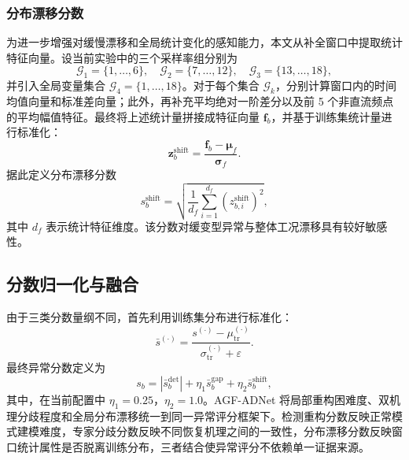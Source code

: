 \documentclass[bachelor, vlined]{DissertUESTC}
\begin{document}
    \subsubsection{分布漂移分数}

    为进一步增强对缓慢漂移和全局统计变化的感知能力，本文从补全窗口中提取统计特征向量。设当前实验中的三个采样率组分别为
    \begin{equation}
        \mathcal{G}_1=\{1,\ldots,6\},\quad
        \mathcal{G}_2=\{7,\ldots,12\},\quad
        \mathcal{G}_3=\{13,\ldots,18\},
    \end{equation}
    并引入全局变量集合 $\mathcal{G}_4=\{1,\ldots,18\}$。对于每个集合 $\mathcal{G}_k$，分别计算窗口内的时间均值向量和标准差向量；此外，再补充平均绝对一阶差分以及前 5 个非直流频点的平均幅值特征。最终将上述统计量拼接成特征向量 $\mathbf{f}_b$，并基于训练集统计量进行标准化：
    \begin{equation}
        \mathbf{z}_b^{\mathrm{shift}} = \frac{\mathbf{f}_b-\boldsymbol{\mu}_f}{\boldsymbol{\sigma}_f}.
    \end{equation}
    据此定义分布漂移分数
    \begin{equation}
        s_b^{\mathrm{shift}}
        =
        \sqrt{
            \frac{1}{d_f}
            \sum_{i=1}^{d_f}
            \left(z_{b,i}^{\mathrm{shift}}\right)^2
        },
    \end{equation}
    其中 $d_f$ 表示统计特征维度。该分数对缓变型异常与整体工况漂移具有较好敏感性。

    \subsection{分数归一化与融合}

    由于三类分数量纲不同，首先利用训练集分布进行标准化：
    \begin{equation}
        \bar{s}^{(\cdot)} = \frac{s^{(\cdot)}-\mu^{(\cdot)}_{\mathrm{tr}}}{\sigma^{(\cdot)}_{\mathrm{tr}} + \varepsilon}.
    \end{equation}
    最终异常分数定义为
    \begin{equation}
        s_b
        =
        \left|\bar{s}_b^{\mathrm{det}}\right|
        +
        \eta_1 \bar{s}_b^{\mathrm{gap}}
        +
        \eta_2 \bar{s}_b^{\mathrm{shift}},
    \end{equation}
    其中，在当前配置中 $\eta_1=0.25$，$\eta_2=1.0$。AGF-ADNet 将局部重构困难度、双机理分歧程度和全局分布漂移统一到同一异常评分框架下。检测重构分数反映正常模式建模难度，专家分歧分数反映不同恢复机理之间的一致性，分布漂移分数反映窗口统计属性是否脱离训练分布，三者结合使异常评分不依赖单一证据来源。
\end{document}
